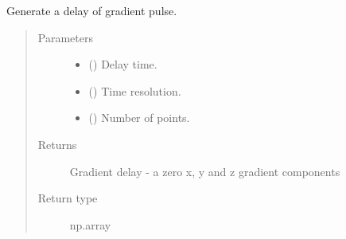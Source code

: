 \documentclass[a4paper,10pt,english]{sphinxmanual}
\begin{document}
\begin{fulllineitems}
\label{\detokenize{autodoc/mrsprint/mrsprint.system:mrsprint.system.gradient.gradient_delay}}
Generate a delay of gradient pulse.
\begin{quote}\begin{description}
\item[{Parameters}] \leavevmode\begin{itemize}
\item {} 
 (\sphinxstyleliteralemphasis{\sphinxupquote{ {[}}}\sphinxstyleliteralemphasis{\sphinxupquote{{]}}}) \textendash{} Delay time.

\item {} 
 (\sphinxstyleliteralemphasis{\sphinxupquote{ {[}}}\sphinxstyleliteralemphasis{\sphinxupquote{{]}}}) \textendash{} Time resolution.

\item {} 
 () \textendash{} Number of points.

\end{itemize}

\item[{Returns}] \leavevmode
Gradient delay - a zero x, y and z gradient components

\item[{Return type}] \leavevmode
np.array

\end{description}\end{quote}

\end{fulllineitems}

\end{document}
